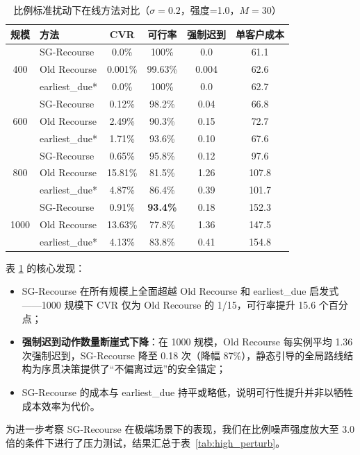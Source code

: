 \documentclass[12pt,a4paper,UTF8]{article}
\begin{document}
\begin{table}[ht]
	\centering\small
	\caption{比例标准扰动下在线方法对比（$\sigma=0.2$，强度=1.0，$M=30$）}
	\label{tab:online_compare}
	\begin{tabular}{clcccc}
		\toprule
		规模 & 方法 & CVR & 可行率 & 强制迟到 & 单客户成本 \\
		\midrule
		\multirow{3}{*}{400}
		& SG-Recourse  & 0.0\%   & 100\%    & 0.0   & 61.1  \\
		& Old Recourse & 0.001\% & 99.63\%  & 0.004 & 62.6  \\
		& earliest\_due* & 0.0\%   & 100\%    & 0.0   & 62.7  \\
		\midrule
		\multirow{3}{*}{600}
		& SG-Recourse  & 0.12\%  & 98.2\%   & 0.04  & 66.8  \\
		& Old Recourse & 2.49\%  & 90.3\%   & 0.15  & 72.7  \\
		& earliest\_due* & 1.71\%  & 93.6\%   & 0.10  & 67.6  \\
		\midrule
		\multirow{3}{*}{800}
		& SG-Recourse  & 0.65\%  & 95.8\%   & 0.12  & 97.6  \\
		& Old Recourse & 15.81\% & 81.5\%   & 1.26  & 107.8 \\
		& earliest\_due* & 4.87\%  & 86.4\%   & 0.39  & 101.7 \\
		\midrule
		\multirow{3}{*}{1000}
		& SG-Recourse  & 0.91\%  & \textbf{93.4\%}  & 0.18  & 152.3 \\
		& Old Recourse & 13.63\% & 77.8\%   & 1.36  & 147.5 \\
		& earliest\_due* & 4.13\%  & 83.8\%   & 0.41  & 154.8 \\
		\bottomrule
	\end{tabular}
\end{table}


表 \ref{tab:online_compare} 的核心发现：
\begin{itemize}
	\item SG-Recourse 在所有规模上全面超越 Old Recourse 和 earliest\_due 启发式——1000 规模下 CVR 仅为 Old Recourse 的 1/15，可行率提升 15.6 个百分点；
	\item \textbf{强制迟到动作数量断崖式下降}：在 1000 规模，Old Recourse 每实例平均 1.36 次强制迟到，SG-Recourse 降至 0.18 次（降幅 87\%），静态引导的全局路线结构为序贯决策提供了“不偏离过远”的安全锚定；
	\item SG-Recourse 的成本与 earliest\_due 持平或略低，说明可行性提升并非以牺牲成本效率为代价。
\end{itemize}

为进一步考察 SG-Recourse 在极端场景下的表现，我们在比例噪声强度放大至 3.0 倍的条件下进行了压力测试，结果汇总于表~\ref{tab:high_perturb}。
\end{document}
